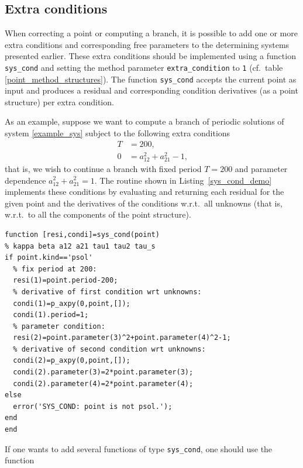 \documentclass[10pt]{scrartcl}
\newcommand{\blist}[1]{\mbox{\lstinline!#1!}}
\begin{document}
{\subsection{Extra conditions}\label{extra_cond}

When correcting a point or computing a branch, it is possible to add
one or more extra conditions and corresponding free parameters to the
determining systems presented earlier. These extra conditions should
be implemented using a function \blist{sys_cond} and setting the
method parameter \blist{extra_condition} to \blist{1} (cf.\ table
\ref{point_method_structures}).  The function \blist{sys_cond} accepts
the current point as input and produces a residual and corresponding
condition derivatives (as a point structure) per extra condition.

As an example, suppose we want to compute a branch of
periodic solutions of system \eqref{example_sys} subject to the following
extra conditions 
\begin{equation}\label{eq:extra_cond}
  \begin{split}
    T&=200, \\
    0&=a_{12}^2+a_{21}^2-1\mbox{,}
  \end{split}
\end{equation}
that is, we wish to continue a branch with fixed period $T=200$ and
parameter dependence $a_{12}^2+a_{21}^2=1$.  The routine shown in
Listing~\ref{sys_cond_demo} implements these conditions by evaluating
and returning each residual for the given point and the derivatives of
the conditions w.r.t.\ all unknowns (that is, w.r.t.\ to all the
components of the point structure).
\begin{lstlisting}[frame=lines,label=sys_cond_demo,caption={Implementation
    extra conditions \eqref{eq:extra_cond} using a routine \blist{sys_cond}.}]
function [resi,condi]=sys_cond(point)
% kappa beta a12 a21 tau1 tau2 tau_s
if point.kind=='psol'
  % fix period at 200:
  resi(1)=point.period-200;
  % derivative of first condition wrt unknowns:
  condi(1)=p_axpy(0,point,[]);
  condi(1).period=1;
  % parameter condition:
  resi(2)=point.parameter(3)^2+point.parameter(4)^2-1;
  % derivative of second condition wrt unknowns:
  condi(2)=p_axpy(0,point,[]);
  condi(2).parameter(3)=2*point.parameter(3);
  condi(2).parameter(4)=2*point.parameter(4);
else
  error('SYS_COND: point is not psol.');
end
end
\end{lstlisting}
If one wants to add several functions of type \blist{sys_cond}, one should use the function
\begin{lstlisting}

\end{lstlisting}}
\end{document}
